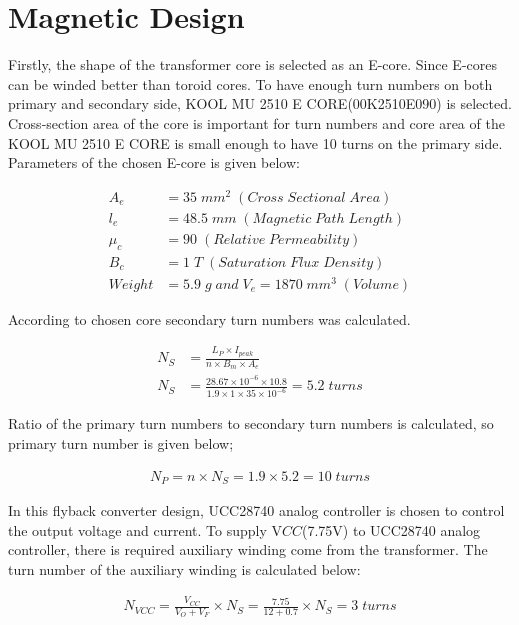 \section{Magnetic Design}

Firstly, the shape of the transformer core is selected as an E-core. Since E-cores can be winded better than toroid cores. To have enough turn numbers on both primary and secondary side, KOOL MU 2510 E CORE(00K2510E090) is selected. Cross-section area of the core is important for turn numbers and core area of the KOOL MU 2510 E CORE is small enough to have 10 turns on the primary side. Parameters of the chosen E-core is given below:

\begin{align}
    A_e &= 35\;mm^2\;(Cross\; Sectional\; Area)\\ l_e &= 48.5\; mm \;(Magnetic\;Path\; Length) \\\mu_c &= 90\; (Relative \;Permeability) \\ B_c &= 1\; T \;(Saturation\; Flux\; Density) \\ Weight &= 5.9\; g\; and\; V_e=1870\; mm^3 \;(Volume) 
\end{align}

According to chosen core secondary turn numbers was calculated.

\begin{align}
    N_S&=\frac{L_P\times I_{peak}}{n\times B_m \times A_e}\\
    N_S&=\frac{28.67\times 10^{-6} \times 10.8 }{1.9 \times 1 \times 35 \times 10^{-6}}=5.2 \;turns
\end{align}

Ratio of the primary turn numbers to secondary turn numbers is calculated, so primary turn number is given below;

\begin{align}
    N_P= n\times N_S = 1.9 \times 5.2 = 10\; turns
\end{align}

In this flyback converter design, UCC28740 analog controller is chosen to control the output voltage and current. To supply V$CC$(7.75V) to UCC28740 analog controller, there is required auxiliary winding come from the transformer. The turn number of the auxiliary winding is calculated below:

\begin{align}
    N_{VCC}= \frac{V_{CC}}{V_O+V_F}\times N_S = \frac{7.75}{12+0.7}\times N_S= 3 \;turns
\end{align}

